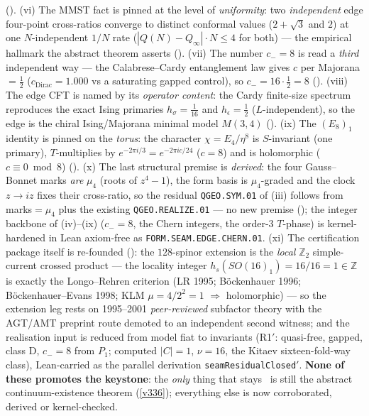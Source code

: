 \documentclass[11pt,a4paper]{article}
\providecommand{\Z}{\mathbb{Z}}
\begin{document}
\begin{winbox}
(). (vi) The MMST fact is pinned at the level of \emph{uniformity}: two
\emph{independent} edge four-point cross-ratios converge to distinct conformal values ($2{+}\sqrt3$ and $2$) at one
$N$-independent $1/N$ rate ($|Q(N){-}Q_\infty|\cdot N\le4$ for both) --- the empirical hallmark the abstract theorem
asserts (). (vii) The number $c_-{=}8$ is read a \emph{third} independent way ---
the Calabrese--Cardy entanglement law gives $c$ per Majorana $=\tfrac12$ ($c_{\mathrm{Dirac}}{=}1.000$ vs a saturating
gapped control), so $c_-{=}16\cdot\tfrac12{=}8$ (). (viii) The edge CFT is
named by its \emph{operator content}: the Cardy finite-size spectrum reproduces the exact Ising primaries
$h_\sigma{=}\tfrac1{16}$ and $h_\epsilon{=}\tfrac12$ ($L$-independent), so the edge is the chiral Ising/Majorana
minimal model $M(3,4)$ (). (ix) The $(E_8)_1$ identity is pinned on the
\emph{torus}: the character $\chi{=}E_4/\eta^8$ is $S$-invariant (one primary), $T$-multiplies by
$e^{-2\pi i/3}{=}e^{-2\pi i c/24}$ ($c{=}8$) and is holomorphic ($c\equiv0\bmod8$)
(). (x) The last structural premise is \emph{derived}: the four Gauss--Bonnet marks
\emph{are} $\mu_4$ (roots of $z^4{-}1$), the form basis is $\mu_4$-graded and the clock $z\!\to\!iz$ fixes their
cross-ratio, so the residual \texttt{QGEO.SYM.01} of (iii) follows from marks$=\mu_4$ plus the existing
\texttt{QGEO.REALIZE.01} --- no new premise (); the integer backbone of
(iv)--(ix) ($c_-{=}8$, the Chern integers, the order-$3$ $T$-phase) is kernel-hardened in Lean axiom-free as
\texttt{FORM.SEAM.EDGE.CHERN.01}. (xi) The certification package itself is re-founded
(): the $128$-spinor extension is the \emph{local} $\Z_2$
simple-current crossed product --- the locality integer $h_s(SO(16)_1){=}16/16{=}1{\in}\Z$ is exactly the
Longo--Rehren criterion (LR 1995; B\"ockenhauer 1996; B\"ockenhauer--Evans 1998; KLM $\mu{=}4/2^2{=}1$
$\Rightarrow$ holomorphic) --- so the extension leg rests on 1995--2001 \emph{peer-reviewed} subfactor theory
with the AGT/AMT preprint route demoted to an independent second witness; and the realisation input is reduced
from model fiat to invariants (R1$'$: quasi-free, gapped, class D, $c_-{=}8$ from $P_1$; computed $|C|{=}1$,
$\nu{=}16$, the Kitaev sixteen-fold-way class), Lean-carried as the parallel derivation
\texttt{seamResidualClosed$'$}. \textbf{None of these promotes the keystone}: the \emph{only} thing
that stays \mO\ is still the abstract continuum-existence theorem (\vref{v336}); everything else is now
corroborated, derived or kernel-checked.


\end{winbox}
\end{document}
